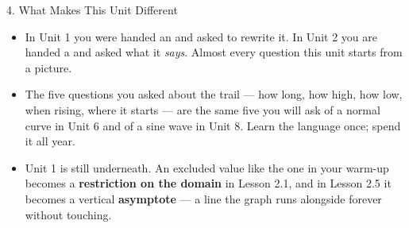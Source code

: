 \documentclass[10pt]{article}
\begin{document}
\boxguard
\begin{notesbox}{4. What Makes This Unit Different}
\small
\begin{itemize}[leftmargin=1.3em, itemsep=3pt, topsep=3pt]
  \item In Unit 1 you were handed an \blank{3.0cm} and asked to rewrite it. In Unit 2 you are
        handed a \blank{3.0cm} and asked what it \emph{says}. Almost every question this unit
        starts from a picture.
  \item The five questions you asked about the trail --- how long, how high, how low, when
        rising, where it starts --- are the same five you will ask of a normal curve in Unit 6 and
        of a sine wave in Unit 8. Learn the language once; spend it all year.
  \item Unit 1 is still underneath. An excluded value like the one in your warm-up becomes a
        \textbf{restriction on the domain} in Lesson 2.1, and in Lesson 2.5 it becomes a vertical
        \textbf{asymptote} --- a line the graph runs alongside forever without touching.
\end{itemize}
\end{notesbox}

\vspace{0.10in}
\end{document}

